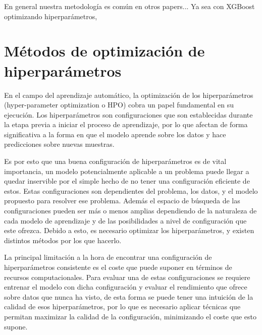 \documentclass{uathesis-es}
\begin{document}
En general nuestra metodología es común en otros papers... Ya sea con XGBoost optimizando hiperparámetros, 

\section{Métodos de optimización de hiperparámetros}
\label{HYPERPARAMETERS_OPTIMIZATION_METHODS}


En el campo del aprendizaje automático, la optimización de los hiperparámetros (hyper-parameter optimization o HPO) cobra un papel fundamental en su ejecución. Los hiperparámetros son configuraciones que son establecidas durante la etapa previa a iniciar el proceso de aprendizaje, por lo que afectan de forma significativa a la forma en que el modelo aprende sobre los datos y hace predicciones sobre nuevas muestras.

Es por esto que una buena configuración de hiperparámetros es de vital importancia, un modelo potencialmente aplicable a un problema puede llegar a quedar inservible por el simple hecho de no tener una configuración eficiente de estos. Estas configuraciones son dependientes del problema, los datos, y el modelo propuesto para resolver ese problema. Además el espacio de búsqueda de las configuraciones pueden ser más o menos amplias dependiendo de la naturaleza de cada modelo de aprendizaje y de las posibilidades a nivel de configuración que este ofrezca. Debido a esto, es necesario optimizar los hiperparámetros, y existen distintos métodos por los que hacerlo.

La principal limitación a la hora de encontrar una configuración de hiperparámetros consistente es el coste que puede suponer en términos de recursos computacionales. Para evaluar una de estas configuraciones se requiere entrenar el modelo con dicha configuración y evaluar el rendimiento que ofrece sobre datos que nunca ha visto, de esta forma se puede tener una intuición de la calidad de esos hiperparámetros, por lo que es necesario aplicar técnicas que permitan maximizar la calidad de la configuración, minimizando el coste que esto supone.
 
\end{document}

